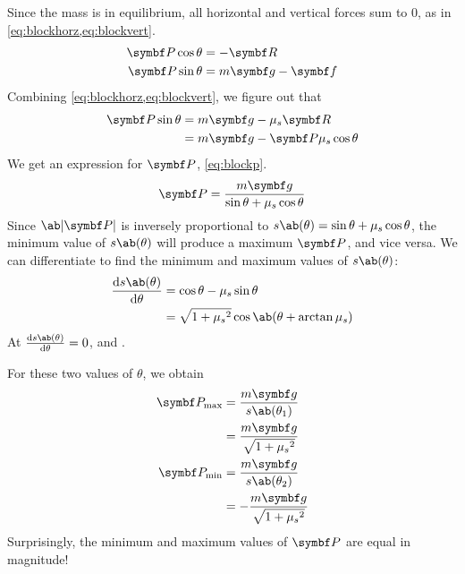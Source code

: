 Since the mass is in equilibrium, all horizontal and vertical forces
sum to \(0\), as in \cref{eq:blockhorz,eq:blockvert}.
\begin{align}
  \label{eq:blockhorz}
  \mv{P}\cos\theta&=-\mv{R} \\
  \mv{P}\sin\theta&=m\mv{g}-\mv{f}
  \label{eq:blockvert}
\end{align}
Combining \cref{eq:blockhorz,eq:blockvert}, we figure out that
\begin{align*}
  \mv{P}\sin\theta&=m\mv{g}-\mu_s\mv{R}\\
  &= m\mv{g}-\mv{P}\mu_s\cos\theta \\
\end{align*}
We get an expression for \(\mv{P}\), \cref{eq:blockp}.
\begin{equation}
  \mv{P} = \f{m\mv{g}}{\sin\theta + \mu_s\cos\theta}
  \label{eq:blockp}
\end{equation}
Since \(\ab|\mv{P}|\) is inversely proportional to
\(s\ab(\theta)=\sin\theta + \mu_s\cos\theta\),
the minimum value of \(s\ab(\theta)\) will produce a maximum
\(\mv{P}\), and vice versa.
We can differentiate to find the minimum and maximum values of \(s\ab(\theta)\):
\begin{align*}
  \odv{s\ab(\theta)}{\theta} &= \cos\theta-\mu_s\sin\theta\\
  &= \sqrt{1 + {\mu_s}^2}\cos\ab(\theta+\arctan\mu_s)
\end{align*}
At \(\odv{s\ab(\theta)}{\theta}=0\),  and
.

For these two values of \(\theta\), we obtain
\begin{align*}
  \mv{P}_{\max} &= \f{m\mv{g}}{s\ab(\theta_1)} \\
  &= \f{m\mv{g}}{\sqrt{1+{\mu_s}^2}} \\
  \mv{P}_{\min} &= \f{m\mv{g}}{s\ab(\theta_2)} \\
  &= -\f{m\mv{g}}{\sqrt{1+{\mu_s}^2}}
\end{align*}
Surprisingly, the minimum and maximum values of \(\mv{P}\) are equal
in magnitude!
